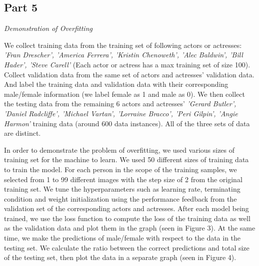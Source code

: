 \documentclass{article}
\begin{document}
\newpage
\begin{part5}

\maketitle

\newpage
\section{Part 5}
\noindent \textit{Demonstration of Overfitting}

\vspace{5mm}

We collect training data from the training set of following actors or actresses: \textit{'Fran Drescher', 'America Ferrera', 'Kristin Chenoweth', 'Alec Baldwin', 'Bill Hader', 'Steve Carell'} (Each actor or actress has a max training set of size 100). Collect validation data from the same set of actors and actresses' validation data. And label the training data and validation data with their corresponding male/female information (we label female as 1 and male as 0). We then collect the testing data from the remaining 6 actors and actresses' \textit{'Gerard Butler', 'Daniel Radcliffe', 'Michael Vartan', 'Lorraine Bracco', 'Peri Gilpin', 'Angie Harmon'} training data (around 600 data instances). All of the three sets of data are distinct.

\vspace{5mm}

In order to demonstrate the problem of overfitting, we used various sizes of training set for the machine to learn. We used 50 different sizes of training data to train the model. For each person in the scope of the training samples, we selected from 1 to 99 different images with the step size of 2 from the original training set. We tune the hyperparameters such as learning rate, terminating condition and weight initialization using the performance feedback from the validation set of the corresponding actors and actresses. After each model being trained, we use the loss function to compute the loss of the training data as well as the validation data and plot them in the graph (seen in Figure 3). At the same time, we make the predictions of male/female with respect to the data in the testing set. We calculate the ratio between the correct predictions and total size of the testing set, then plot the data in a separate graph (seen in Figure 4). 

\vspace{5mm}


\end{part5}
\end{document}
